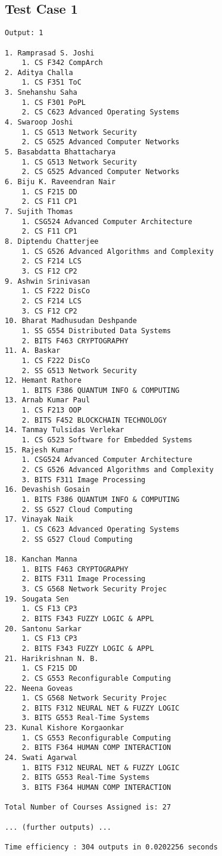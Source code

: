 \documentclass{article}
\begin{document}
\subsection{Test Case 1}
\begin{lstlisting}[basicstyle=\ttfamily\footnotesize, breaklines=true]
Output: 1

1. Ramprasad S. Joshi
    1. CS F342 CompArch
2. Aditya Challa
    1. CS F351 ToC
3. Snehanshu Saha
    1. CS F301 PoPL
    2. CS C623 Advanced Operating Systems
4. Swaroop Joshi
    1. CS G513 Network Security
    2. CS G525 Advanced Computer Networks
5. Basabdatta Bhattacharya
    1. CS G513 Network Security
    2. CS G525 Advanced Computer Networks
6. Biju K. Raveendran Nair
    1. CS F215 DD
    2. CS F11 CP1
7. Sujith Thomas
    1. CSG524 Advanced Computer Architecture
    2. CS F11 CP1
8. Diptendu Chatterjee
    1. CS G526 Advanced Algorithms and Complexity
    2. CS F214 LCS
    3. CS F12 CP2
9. Ashwin Srinivasan
    1. CS F222 DisCo
    2. CS F214 LCS
    3. CS F12 CP2
10. Bharat Madhusudan Deshpande
    1. SS G554 Distributed Data Systems
    2. BITS F463 CRYPTOGRAPHY
11. A. Baskar
    1. CS F222 DisCo
    2. SS G513 Network Security
12. Hemant Rathore
    1. BITS F386 QUANTUM INFO & COMPUTING
13. Arnab Kumar Paul
    1. CS F213 OOP
    2. BITS F452 BLOCKCHAIN TECHNOLOGY
14. Tanmay Tulsidas Verlekar
    1. CS G523 Software for Embedded Systems
15. Rajesh Kumar
    1. CSG524 Advanced Computer Architecture
    2. CS G526 Advanced Algorithms and Complexity
    3. BITS F311 Image Processing
16. Devashish Gosain
    1. BITS F386 QUANTUM INFO & COMPUTING
    2. SS G527 Cloud Computing
17. Vinayak Naik
    1. CS C623 Advanced Operating Systems
    2. SS G527 Cloud Computing
    
18. Kanchan Manna
    1. BITS F463 CRYPTOGRAPHY
    2. BITS F311 Image Processing
    3. CS G568 Network Security Projec
19. Sougata Sen
    1. CS F13 CP3
    2. BITS F343 FUZZY LOGIC & APPL
20. Santonu Sarkar
    1. CS F13 CP3
    2. BITS F343 FUZZY LOGIC & APPL
21. Harikrishnan N. B.
    1. CS F215 DD
    2. CS G553 Reconfigurable Computing
22. Neena Goveas
    1. CS G568 Network Security Projec
    2. BITS F312 NEURAL NET & FUZZY LOGIC
    3. BITS G553 Real-Time Systems
23. Kunal Kishore Korgaonkar
    1. CS G553 Reconfigurable Computing
    2. BITS F364 HUMAN COMP INTERACTION
24. Swati Agarwal
    1. BITS F312 NEURAL NET & FUZZY LOGIC
    2. BITS G553 Real-Time Systems
    3. BITS F364 HUMAN COMP INTERACTION

Total Number of Courses Assigned is: 27

... (further outputs) ...

Time efficiency : 304 outputs in 0.0202256 seconds

\end{lstlisting}
\end{document}
